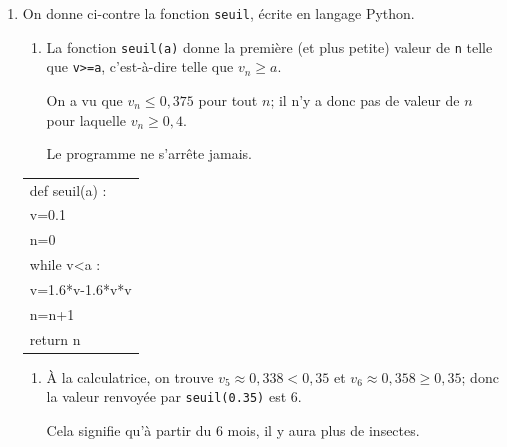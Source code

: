 \begin{enumerate}[resume]
\item  On donne ci-contre la fonction \texttt{seuil}, écrite en langage Python.

\begin{minipage}{0.6\linewidth}
	\begin{enumerate}
		\item %
La fonction \texttt{seuil(a)} donne la première (et plus petite) valeur de \texttt{n} telle que \texttt{v>=a}, c'est-à-dire telle que $v_n\geqslant a$.

On a vu que $v_n\leqslant 0,375$ pour tout $n$; il n'y a donc pas de valeur de $n$ pour laquelle $v_n\geqslant 0,4$.

Le programme ne s'arrête jamais.
	\end{enumerate}
\end{minipage}\hfill
\begin{minipage}{0.36\linewidth}
\begin{tabularx}{\linewidth}{|X|}\hline
def seuil(a) :\\
\qquad v=0.1\\
\qquad n=0\\
\qquad while v<a :\\
\qquad \qquad v=1.6*v-1.6*v*v\\
\qquad \qquad n=n+1\\
\qquad return n\\ \hline
\end{tabularx}
\end{minipage}

\begin{enumerate}[resume]
		\item %
À la calculatrice, on trouve $v_5\approx 0,338 <0,35$ et $v_6\approx 0,358 \geqslant 0,35$; donc la valeur renvoyée par \texttt{seuil(0.35)} est 6.
		
Cela signifie qu'à partir du 6\ieme{} mois, il y aura plus de  insectes.
\end{enumerate}	

\end{enumerate}	

\bigskip

